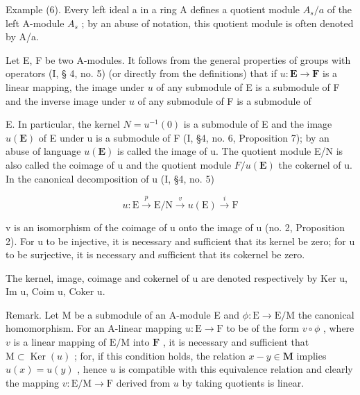 Example (6). Every left ideal a in a ring A defines a quotient module \(A_{s}/a\) of the left A-module \(A_{s}\) ; by an abuse of notation, this quotient module is often denoted by A/a.

Let E, F be two A-modules. It follows from the general properties of groups with operators (I, § 4, no. 5) (or directly from the definitions) that if \(u: \mathbf{E} \to \mathbf{F}\) is a linear mapping, the image under \(u\) of any submodule of E is a submodule of F and the inverse image under \(u\) of any submodule of F is a submodule of

E. In particular, the kernel \(N = u^{-1}(0)\) is a submodule of E and the image \(u(\mathbf{E})\) of E under u is a submodule of F (I, §4, no. 6, Proposition 7); by an abuse of language \(u(\mathbf{E})\) is called the image of u. The quotient module E/N is also called the coimage of u and the quotient module \(F/u(\mathbf{E})\) the cokernel of u. In the canonical decomposition of u (I, §4, no. 5)

\[
u: \mathrm{E} \xrightarrow {p} \mathrm{E} / \mathrm{N} \xrightarrow {v} u (\mathrm{E}) \xrightarrow {i} \mathrm{F}\tag{11}
\]

v is an isomorphism of the coimage of u onto the image of u (no. 2, Proposition 2). For u to be injective, it is necessary and sufficient that its kernel be zero; for u to be surjective, it is necessary and sufficient that its cokernel be zero.

The kernel, image, coimage and cokernel of u are denoted respectively by Ker u, Im u, Coim u, Coker u.

Remark. Let M be a submodule of an A-module E and \(\phi: \mathrm{E} \to \mathrm{E} / \mathrm{M}\) the canonical homomorphism. For an A-linear mapping \(u: \mathrm{E} \to \mathrm{F}\) to be of the form \(v \circ \phi\) , where \(v\) is a linear mapping of \(\mathrm{E} / \mathrm{M}\) into \(\mathbf{F}\) , it is necessary and sufficient that \(\mathrm{M} \subset \operatorname{Ker}(u)\) ; for, if this condition holds, the relation \(x - y \in \mathbf{M}\) implies \(u(x) = u(y)\) , hence \(u\) is compatible with this equivalence relation and clearly the mapping \(v: \mathrm{E} / \mathrm{M} \to \mathrm{F}\) derived from \(u\) by taking quotients is linear.


